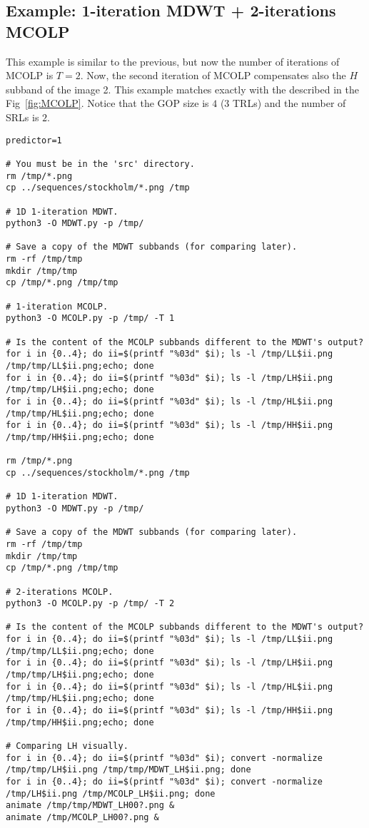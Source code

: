 \subsection*{Example: 1-iteration MDWT + 2-iterations MCOLP}
This example is similar to the previous, but now the number of
iterations of MCOLP is $T=2$. Now, the second iteration of MCOLP
compensates also the $H$ subband of the image 2. This example matches
exactly with the described in the Fig~\ref{fig:MCOLP}. Notice that the
GOP size is $4$ ($3$ TRLs) and the number of SRLs is $2$.

\begin{verbatim}
predictor=1

# You must be in the 'src' directory.
rm /tmp/*.png
cp ../sequences/stockholm/*.png /tmp

# 1D 1-iteration MDWT.
python3 -O MDWT.py -p /tmp/

# Save a copy of the MDWT subbands (for comparing later).
rm -rf /tmp/tmp
mkdir /tmp/tmp
cp /tmp/*.png /tmp/tmp

# 1-iteration MCOLP.
python3 -O MCOLP.py -p /tmp/ -T 1

# Is the content of the MCOLP subbands different to the MDWT's output?
for i in {0..4}; do ii=$(printf "%03d" $i); ls -l /tmp/LL$ii.png /tmp/tmp/LL$ii.png;echo; done
for i in {0..4}; do ii=$(printf "%03d" $i); ls -l /tmp/LH$ii.png /tmp/tmp/LH$ii.png;echo; done
for i in {0..4}; do ii=$(printf "%03d" $i); ls -l /tmp/HL$ii.png /tmp/tmp/HL$ii.png;echo; done
for i in {0..4}; do ii=$(printf "%03d" $i); ls -l /tmp/HH$ii.png /tmp/tmp/HH$ii.png;echo; done

rm /tmp/*.png
cp ../sequences/stockholm/*.png /tmp

# 1D 1-iteration MDWT.
python3 -O MDWT.py -p /tmp/

# Save a copy of the MDWT subbands (for comparing later).
rm -rf /tmp/tmp
mkdir /tmp/tmp
cp /tmp/*.png /tmp/tmp

# 2-iterations MCOLP.
python3 -O MCOLP.py -p /tmp/ -T 2

# Is the content of the MCOLP subbands different to the MDWT's output?
for i in {0..4}; do ii=$(printf "%03d" $i); ls -l /tmp/LL$ii.png /tmp/tmp/LL$ii.png;echo; done
for i in {0..4}; do ii=$(printf "%03d" $i); ls -l /tmp/LH$ii.png /tmp/tmp/LH$ii.png;echo; done
for i in {0..4}; do ii=$(printf "%03d" $i); ls -l /tmp/HL$ii.png /tmp/tmp/HL$ii.png;echo; done
for i in {0..4}; do ii=$(printf "%03d" $i); ls -l /tmp/HH$ii.png /tmp/tmp/HH$ii.png;echo; done

# Comparing LH visually.
for i in {0..4}; do ii=$(printf "%03d" $i); convert -normalize /tmp/tmp/LH$ii.png /tmp/tmp/MDWT_LH$ii.png; done
for i in {0..4}; do ii=$(printf "%03d" $i); convert -normalize /tmp/LH$ii.png /tmp/MCOLP_LH$ii.png; done
animate /tmp/tmp/MDWT_LH00?.png &
animate /tmp/MCOLP_LH00?.png &


\end{verbatim}
